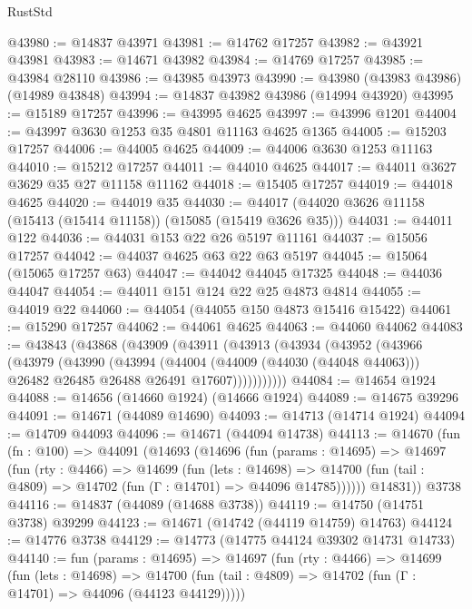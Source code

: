 \begin{lexlean}{RustStd}
\begin{coremodule}
@43980 := @14837 @43971
@43981 := @14762 @17257
@43982 := @43921 @43981
@43983 := @14671 @43982
@43984 := @14769 @17257
@43985 := @43984 @28110
@43986 := @43985 @43973
@43990 := @43980 (@43983 @43986) (@14989 @43848)
@43994 := @14837 @43982 @43986 (@14994 @43920)
@43995 := @15189 @17257
@43996 := @43995 @4625
@43997 := @43996 @1201
@44004 := @43997 @3630 @1253 @35 @4801 @11163 @4625 @1365
@44005 := @15203 @17257
@44006 := @44005 @4625
@44009 := @44006 @3630 @1253 @11163
@44010 := @15212 @17257
@44011 := @44010 @4625
@44017 := @44011 @3627 @3629 @35 @27 @11158 @11162
@44018 := @15405 @17257
@44019 := @44018 @4625
@44020 := @44019 @35
@44030 := @44017 (@44020 @3626 @11158 (@15413 (@15414 @11158)) (@15085 (@15419 @3626 @35)))
@44031 := @44011 @122
@44036 := @44031 @153 @22 @26 @5197 @11161
@44037 := @15056 @17257
@44042 := @44037 @4625 @63 @22 @63 @5197
@44045 := @15064 (@15065 @17257 @63)
@44047 := @44042 @44045 @17325
@44048 := @44036 @44047
@44054 := @44011 @151 @124 @22 @25 @4873 @4814
@44055 := @44019 @22
@44060 := @44054 (@44055 @150 @4873 @15416 @15422)
@44061 := @15290 @17257
@44062 := @44061 @4625
@44063 := @44060 @44062
@44083 := @43843
    (@43868
      (@43909
        (@43911
          (@43913
            (@43934
              (@43952
                (@43966
                  (@43979
                    (@43990
                      (@43994
                        (@44004
                          (@44009 (@44030 (@44048 @44063)))
                          @26482
                          @26485
                          @26488
                          @26491
                          @17607)))))))))))
@44084 := @14654 @1924
@44088 := @14656 (@14660 @1924) (@14666 @1924)
@44089 := @14675 @39296
@44091 := @14671 (@44089 @14690)
@44093 := @14713 (@14714 @1924)
@44094 := @14709 @44093
@44096 := @14671 (@44094 @14738)
@44113 := @14670
    (fun (fn : @100) =>
    @44091
      (@14693
        (@14696
          (fun (params : @14695) =>
          @14697
            (fun (rty : @4466) =>
            @14699
              (fun (lets : @14698) =>
              @14700 (fun (tail : @4809) => @14702 (fun (Γ : @14701) => @44096 @14785))))))
        @14831))
    @3738
@44116 := @14837 (@44089 (@14688 @3738))
@44119 := @14750 (@14751 @3738) @39299
@44123 := @14671 (@14742 (@44119 @14759) @14763)
@44124 := @14776 @3738
@44129 := @14773 (@14775 @44124 @39302 @14731 @14733)
@44140 := fun (params : @14695) =>
  @14697
    (fun (rty : @4466) =>
    @14699
      (fun (lets : @14698) =>
      @14700 (fun (tail : @4809) => @14702 (fun (Γ : @14701) => @44096 (@44123 @44129)))))

\end{coremodule}
\end{lexlean}
